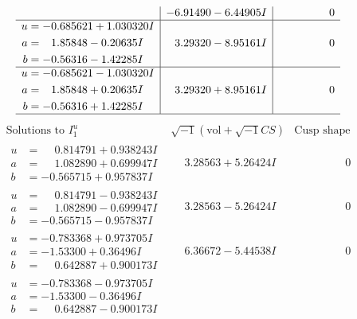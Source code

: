 \documentclass[1p]{elsarticle_modified}
\theoremstyle{definition}
\newcommand{\I}{\sqrt{-1}}
\begin{document}
$$\begin{array}{c|c|c}
 & -6.91490 - 6.44905 I & \phantom{-0.000000 } 0 \\ \hline\begin{aligned}
u &= -0.685621 + 1.030320 I \\
a &= \phantom{-}1.85848 - 0.20635 I \\
b &= -0.56316 - 1.42285 I\end{aligned}
 & \phantom{-}3.29320 - 8.95161 I & \phantom{-0.000000 } 0 \\ \hline\begin{aligned}
u &= -0.685621 - 1.030320 I \\
a &= \phantom{-}1.85848 + 0.20635 I \\
b &= -0.56316 + 1.42285 I\end{aligned}
 & \phantom{-}3.29320 + 8.95161 I & \phantom{-0.000000 } 0\\
 \hline 
 \end{array}$$\newpage$$\begin{array}{c|c|c}  
\text{Solutions to }I^u_{1}& \I (\text{vol} + \sqrt{-1}CS) & \text{Cusp shape}\\
 \hline 
\begin{aligned}
u &= \phantom{-}0.814791 + 0.938243 I \\
a &= \phantom{-}1.082890 + 0.699947 I \\
b &= -0.565715 + 0.957837 I\end{aligned}
 & \phantom{-}3.28563 + 5.26424 I & \phantom{-0.000000 } 0 \\ \hline\begin{aligned}
u &= \phantom{-}0.814791 - 0.938243 I \\
a &= \phantom{-}1.082890 - 0.699947 I \\
b &= -0.565715 - 0.957837 I\end{aligned}
 & \phantom{-}3.28563 - 5.26424 I & \phantom{-0.000000 } 0 \\ \hline\begin{aligned}
u &= -0.783368 + 0.973705 I \\
a &= -1.53300 + 0.36496 I \\
b &= \phantom{-}0.642887 + 0.900173 I\end{aligned}
 & \phantom{-}6.36672 - 5.44538 I & \phantom{-0.000000 } 0 \\ \hline\begin{aligned}
u &= -0.783368 - 0.973705 I \\
a &= -1.53300 - 0.36496 I \\
b &= \phantom{-}0.642887 - 0.900173 I\end{aligned}

\end{array}$$
\end{document}
